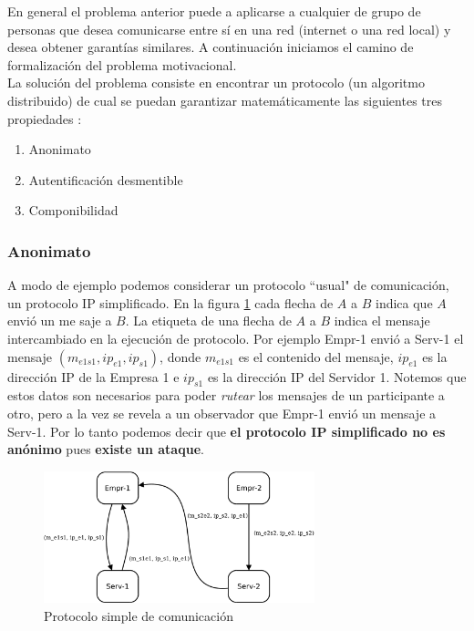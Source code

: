 En general el problema anterior puede a aplicarse a cualquier de grupo de personas que
desea comunicarse entre sí en una red (internet o una red local) y desea obtener garantías
similares. A continuación iniciamos el camino de formalización del problema motivacional.\\
La solución del problema consiste en encontrar un protocolo (un algoritmo distribuido) de cual
se puedan garantizar matemáticamente las siguientes tres propiedades :
\begin{enumerate}
    \item Anonimato
    \item Autentificación desmentible
    \item Componibilidad
\end{enumerate}

\subsubsection{Anonimato}
A modo de ejemplo podemos considerar un protocolo ``usual" de comunicación, un protocolo IP simplificado.
En la figura \ref{tcpip_simple} cada flecha de $A$ a $B$ indica que $A$ envió un me saje a
$B$. La etiqueta de una flecha de $A$ a $B$ indica el mensaje intercambiado en la ejecución de protocolo.
Por ejemplo Empr-1 envió a Serv-1 el mensaje $(m_{e1s1}, ip_{e1}, ip_{s1})$, donde $m_{e1s1}$ es el contenido
del mensaje, $ip_{e1}$ es la dirección IP de la Empresa 1 e $ip_{s1}$ es la dirección IP del Servidor 1.
Notemos que estos
datos son necesarios para poder \textit{rutear} los mensajes de un participante a otro, pero a la vez 
se revela a un observador que Empr-1 envió un mensaje a Serv-1. Por lo tanto podemos decir que
\textbf{el protocolo IP simplificado no es anónimo} pues \textbf{existe un ataque}.\\

\begin{figure}[hp]
    \centering
    \includegraphics[width=0.7\textwidth]{figs/tcpip_simple}
    \caption{Protocolo simple de comunicación}
    \label{tcpip_simple}
\end{figure}

